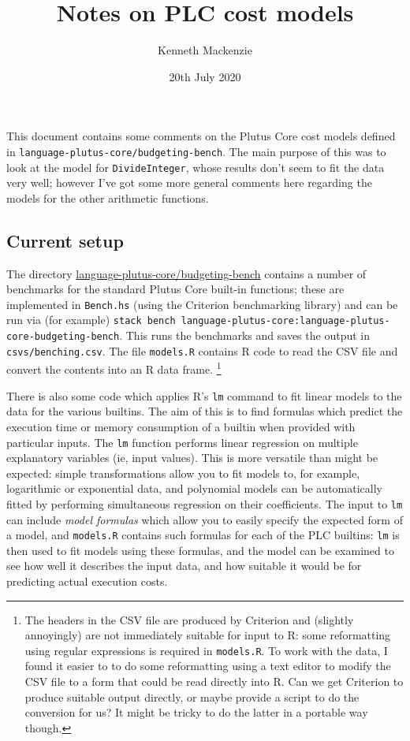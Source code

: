 \documentclass[a4paper]{article}
\title{Notes on PLC cost models}
\author{Kenneth Mackenzie}
\date{20th July 2020}
\begin{document}
\maketitle
\noindent This document contains some comments on the Plutus Core cost models
defined in \verb|language-plutus-core/budgeting-bench|.  The main purpose
of this was to look at the model for \verb|DivideInteger|, whose results
don't seem to fit the data very well; however I've got some more general
comments here regarding the models for the other arithmetic functions.

\subsection*{Current setup}  The directory \url{language-plutus-core/budgeting-bench}
contains a number of benchmarks for the standard Plutus Core built-in
functions; these are implemented in \verb|Bench.hs| (using the
Criterion benchmarking library) and can be run via (for example)
\verb|stack bench language-plutus-core:|\verb|language-|\verb|plutus-|\\ \verb|core-budgeting-bench|.  This runs the benchmarks
and saves the output in \verb|csvs/benching.csv|.  The file
\verb|models.R| contains R code to read the CSV file and convert the
contents into an R data frame.%
\footnote{The headers in the CSV file are produced by Criterion and
  (slightly annoyingly) are not immediately suitable for input to R:
  some reformatting using regular expressions is required in
  \texttt{models.R}.  To work with the data, I found it easier to
  to do some reformatting using a text editor to modify the CSV
  file to a form that could be read directly into R.  Can we get Criterion
  to produce suitable output directly, or maybe provide a script to
  do the conversion for us?  It might be tricky to do the latter in a portable way though.}

There is also some code which applies R's \verb|lm| command to fit
linear models to the data for the various builtins.  The aim of this
is to find formulas which predict the execution time or memory
consumption of a builtin when provided with particular inputs.  The
\texttt{lm} function performs linear regression on multiple
explanatory variables (ie, input values).  This is more versatile than
might be expected: simple transformations allow you to fit models to,
for example, logarithmic or exponential data, and polynomial models
can be automatically fitted by performing simultaneous regression on
their coefficients.  The input to \texttt{lm} can include
\textit{model formulas} which allow you to easily specify the expected
form of a model, and \verb|models.R| contains such formulas for each
of the PLC builtins: \verb|lm| is then used to fit models using these
formulas, and the model can be examined to see how well it describes
the input data, and how suitable it would be for predicting actual
execution costs.
\end{document}

